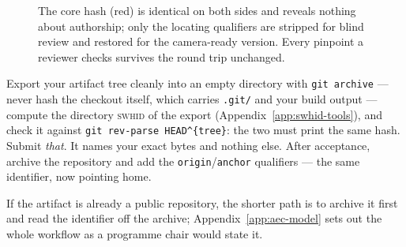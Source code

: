 \begin{figure}[htbp]
  \centering
  \caption[Double-blind in one reversible edit]{The core hash (red) is identical on both sides and
  reveals nothing about authorship; only the locating qualifiers are stripped for blind review and
  restored for the camera-ready version. Every pinpoint a reviewer checks survives the round trip
  unchanged.}
  \label{fig:doubleblind}
\end{figure}


\begin{handson}
Export your artifact tree cleanly into an empty directory with \texttt{git archive} --- never hash
the checkout itself, which carries \texttt{.git/} and your build output --- compute the directory
\textsc{swhid} of the export (Appendix~\ref{app:swhid-tools}), and check it against
\texttt{git rev-parse HEAD\^{}\{tree\}}: the two must print the same hash. Submit \emph{that}. It
names your exact bytes and nothing else. After acceptance, archive the repository and add the
\texttt{origin}/\texttt{anchor} qualifiers --- the same identifier, now pointing home.

\smallskip
If the artifact is already a public repository, the shorter path is to archive it first and read
the identifier off the archive; Appendix~\ref{app:aec-model} sets out the whole workflow as a
programme chair would state it.
\end{handson}

